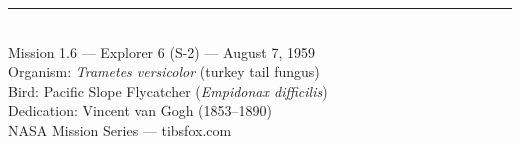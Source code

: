 \documentclass[12pt, letterpaper]{article}
\begin{document}
\vfill

\begin{center}
\small
\rule{0.3\textwidth}{0.4pt}\\[0.5em]
Mission 1.6 --- Explorer 6 (S-2) --- August 7, 1959\\
Organism: \textit{Trametes versicolor} (turkey tail fungus)\\
Bird: Pacific Slope Flycatcher (\textit{Empidonax difficilis})\\
Dedication: Vincent van Gogh (1853--1890)\\[0.3em]
NASA Mission Series --- tibsfox.com
\end{center}
\end{document}
